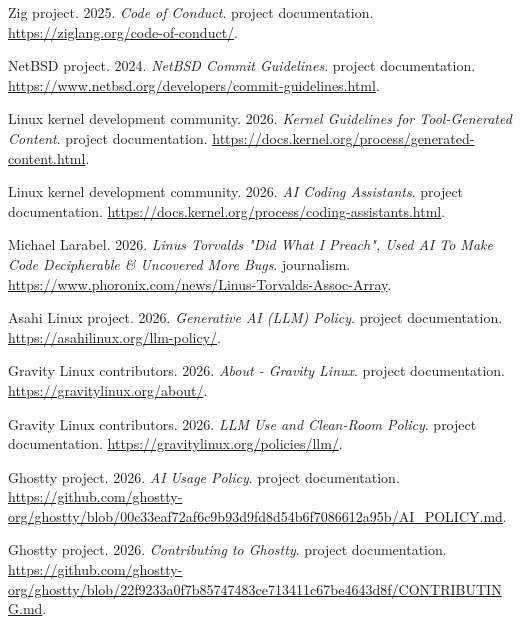 {\begin{description}[leftmargin=2em,labelwidth=1.5em,itemsep=1pt,parsep=0pt]
\item[48.] \hypertarget{ref-zigpolicy2026}{} Zig project. 2025. \textit{Code of Conduct}. project documentation. \url{https://ziglang.org/code-of-conduct/}.

\item[49.] \hypertarget{ref-netbsdpolicy2024}{} NetBSD project. 2024. \textit{NetBSD Commit Guidelines}. project documentation. \url{https://www.netbsd.org/developers/commit-guidelines.html}.

\item[50.] \hypertarget{ref-linuxgenerated2026}{} Linux kernel development community. 2026. \textit{Kernel Guidelines for Tool-Generated Content}. project documentation. \url{https://docs.kernel.org/process/generated-content.html}.

\item[51.] \hypertarget{ref-linuxassistants2026}{} Linux kernel development community. 2026. \textit{AI Coding Assistants}. project documentation. \url{https://docs.kernel.org/process/coding-assistants.html}.

\item[52.] \hypertarget{ref-torvaldsassoc2026}{} Michael Larabel. 2026. \textit{Linus Torvalds "Did What I Preach", Used AI To Make Code Decipherable \& Uncovered More Bugs}. journalism. \url{https://www.phoronix.com/news/Linus-Torvalds-Assoc-Array}.

\item[53.] \hypertarget{ref-asahipolicy2026}{} Asahi Linux project. 2026. \textit{Generative AI (LLM) Policy}. project documentation. \url{https://asahilinux.org/llm-policy/}.

\item[54.] \hypertarget{ref-gravityabout2026}{} Gravity Linux contributors. 2026. \textit{About - Gravity Linux}. project documentation. \url{https://gravitylinux.org/about/}.

\item[55.] \hypertarget{ref-gravitypolicy2026}{} Gravity Linux contributors. 2026. \textit{LLM Use and Clean-Room Policy}. project documentation. \url{https://gravitylinux.org/policies/llm/}.

\item[56.] \hypertarget{ref-ghosttypolicy2026}{} Ghostty project. 2026. \textit{AI Usage Policy}. project documentation. \url{https://github.com/ghostty-org/ghostty/blob/00c33eaf72af6c9b93d9fd8d54b6f7086612a95b/AI\_POLICY.md}.

\item[57.] \hypertarget{ref-ghosttycontribution2026}{} Ghostty project. 2026. \textit{Contributing to Ghostty}. project documentation. \url{https://github.com/ghostty-org/ghostty/blob/22f9233a0f7b85747483ce713411c67be4643d8f/CONTRIBUTING.md}.


\end{description}}
